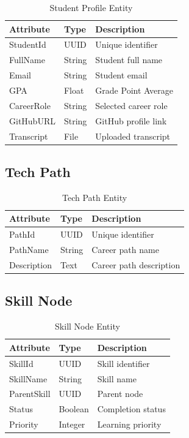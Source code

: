 \begin{table}[H]
\centering
\caption{Student Profile Entity}
\begin{tabular}{|l|l|p{8cm}|}
\hline
\textbf{Attribute} & \textbf{Type} & \textbf{Description} \\ \hline

StudentId & UUID & Unique identifier \\ \hline
FullName & String & Student full name \\ \hline
Email & String & Student email \\ \hline
GPA & Float & Grade Point Average \\ \hline
CareerRole & String & Selected career role \\ \hline
GitHubURL & String & GitHub profile link \\ \hline
Transcript & File & Uploaded transcript \\ \hline

\end{tabular}
\end{table}

\subsection{Tech Path}

\begin{table}[H]
\centering
\caption{Tech Path Entity}
\begin{tabular}{|l|l|p{8cm}|}
\hline
Attribute & Type & Description \\ \hline
PathId & UUID & Unique identifier \\ \hline
PathName & String & Career path name \\ \hline
Description & Text & Career path description \\ \hline
\end{tabular}
\end{table}

\subsection{Skill Node}

\begin{table}[H]
\centering
\caption{Skill Node Entity}
\begin{tabular}{|l|l|p{8cm}|}
\hline
Attribute & Type & Description \\ \hline
SkillId & UUID & Skill identifier \\ \hline
SkillName & String & Skill name \\ \hline
ParentSkill & UUID & Parent node \\ \hline
Status & Boolean & Completion status \\ \hline
Priority & Integer & Learning priority \\ \hline
\end{tabular}
\end{table}

